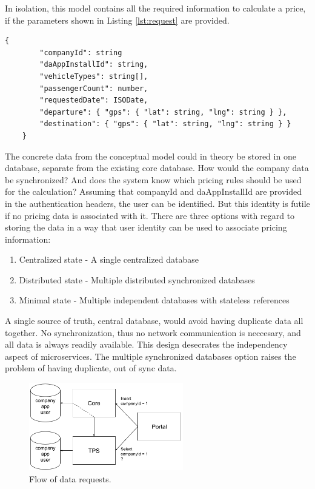 In isolation, this model contains all the required information to calculate a price, if the parameters shown in Listing \ref{lst:request} are provided.

\begin{lstlisting}[caption={Minimal external information required for a trip price calculation.}, label={lst:request}]
	{
		"companyId": string
		"daAppInstallId": string,
		"vehicleTypes": string[],
		"passengerCount": number,
		"requestedDate": ISODate,
		"departure": { "gps": { "lat": string, "lng": string } },
		"destination": { "gps": { "lat": string, "lng": string } }
	}
\end{lstlisting}

The concrete data from the conceptual model could in theory be stored in one database, separate from the existing core database. How would the company data be synchronized? And does the system know which pricing rules should be used for the calculation? Assuming that companyId and daAppInstallId are provided in the authentication headers, the user can be identified. But this identity is futile if no pricing data is associated with it. There are three options with regard to storing the data in a way that user identity can be used to associate pricing information:

\begin{enumerate}
	\item Centralized state - A single centralized database
	\item Distributed state - Multiple distributed synchronized databases
	\item Minimal state - Multiple independent databases with stateless references
\end{enumerate}

A single source of truth, central database, would avoid having duplicate data all together. No synchronization, thus no network communication is neccesary, and all data is always readily available. This design desecrates the independency aspect of microservices. The multiple synchronized databases option raises the problem of having duplicate, out of sync data.

\begin{figure}[H]
	\centering
	\includegraphics[width=0.6\textwidth]{DataSync}
	\caption[DataSync]{Flow of data requests.}
	\label{fig:DataSync}
\end{figure}


